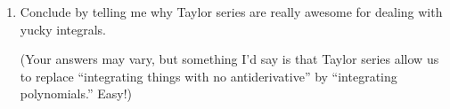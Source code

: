 \begin{enumerate}[leftmargin=0pt]
\begin{red}
    You can check that our five-term approximation is about $0.6827071$ -- so we can be confident that the true value rounded to the fourth decimal place is exactly $0.6827$.
    
    (Aside: The Lagrange error bound is probably a bad idea here because the pattern in the derivatives is, uh, \href{https://math.stackexchange.com/questions/1488210/how-to-get-nth-derivative-of-ex2-2}{complicated}.)
    \end{red}

    \item Conclude by telling me why Taylor series are really awesome for dealing with yucky integrals.

    \begin{red}
        (Your answers may vary, but something I'd say is that Taylor series allow us to replace ``integrating things with no antiderivative'' by ``integrating polynomials.'' Easy!)
    \end{red}
\end{enumerate}
